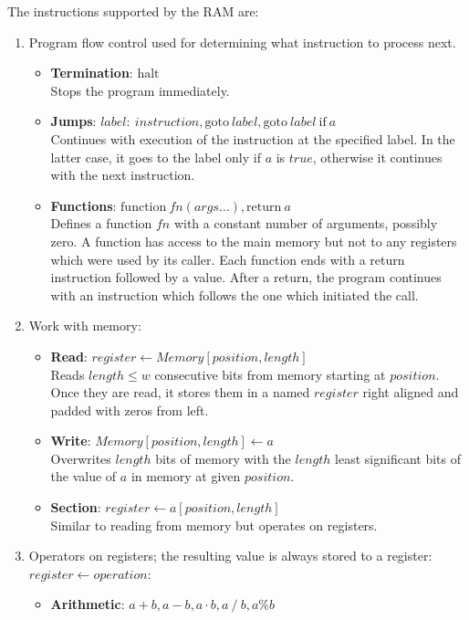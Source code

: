 The instructions supported by the RAM are:
\begin{enumerate}
	\item Program flow control used for determining what instruction to process next.
	\begin{itemize}
		\item \textbf{Termination}: $\textrm{halt}$ \\
		Stops the program immediately.
		\item \textbf{Jumps}: $label{:}\ instruction, \textrm{goto}\ label, \textrm{goto}\ label\ \textrm{if}\ a$ \\
		Continues with execution of the instruction at the specified label.
		In the latter case, it goes to the label only if $a$ is $true$, otherwise it continues with the next instruction.
		\item \textbf{Functions}: $\textrm{function}\ fn(args\ldots), \textrm{return}\ a$ \\
		Defines a function $fn$ with a constant number of arguments, possibly zero.
		A function has access to the main memory but not to any registers which were used by its caller.
		Each function ends with a return instruction followed by a value.
		After a return, the program continues with an instruction which follows the one which initiated the call.
	\end{itemize}
	\item Work with memory:
	\begin{itemize}
		\item \textbf{Read}: $register \gets Memory[position, length]$ \\
		Reads $length \le w$ consecutive bits from memory starting at $position$.
		Once they are read, it stores them in a named $register$ right aligned and padded with zeros from left.
		\item \textbf{Write}: $Memory[position, length] \gets a$ \\
		Overwrites $length$ bits of memory with the $length$ least significant bits of the value of $a$ in memory at given $position$.
		\item \textbf{Section}: $register \gets a[position, length]$ \\
		Similar to reading from memory but operates on registers.
	\end{itemize}
	\item Operators on registers; the resulting value is always stored to a register: $register \gets operation$:
	\begin{itemize}
		\item \textbf{Arithmetic}: $a + b, a - b, a \cdot b, a \mathbin{/} b, a \% b$ \\

\end{itemize}
\end{enumerate}
